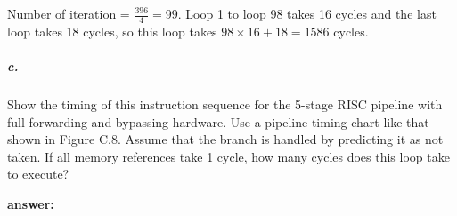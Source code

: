 \documentclass{article}
\begin{document}
\begin{figure}[!ht]
\end{figure}

Number of iteration = $\frac{396}{4}=99$. Loop 1 to loop 98 takes 16 cycles and the last loop takes 18 cycles, so this loop takes $98\times 16+18=1586$ cycles.

\subparagraph{c.} Show the timing of this instruction sequence for the 5-stage RISC pipeline with full forwarding and bypassing hardware. Use a pipeline timing chart like that shown in Figure C.8. Assume that the branch is handled by predicting it as not taken. If all memory references take 1 cycle, how many cycles does this loop take to execute?

\noindent \textbf{answer:} 
\end{document}
